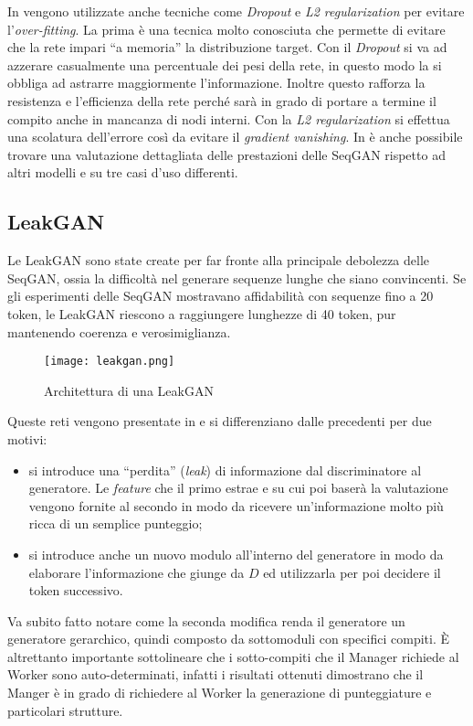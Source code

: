 In \cite{SeqGAN} vengono utilizzate anche tecniche come \emph{Dropout} e \emph{L2 regularization} per evitare l'\emph{over-fitting}. %
La prima è una tecnica molto conosciuta che permette di evitare che la rete impari ``a memoria'' la distribuzione target.
Con il \emph{Dropout} si va ad azzerare casualmente una percentuale dei pesi della rete, in questo modo la si obbliga ad astrarre maggiormente l'informazione.
Inoltre questo rafforza la resistenza e l'efficienza della rete perché sarà in grado di portare a termine il compito anche in mancanza di nodi interni.
Con la \emph{L2 regularization} si effettua una scolatura dell'errore così da evitare il \emph{gradient vanishing}. %
In \cite{SeqGAN} è anche possibile trovare una valutazione dettagliata delle prestazioni delle SeqGAN rispetto ad altri modelli e su tre casi d'uso differenti.


\subsection{LeakGAN}
Le LeakGAN sono state create per far fronte alla principale debolezza delle SeqGAN, ossia la difficoltà nel generare sequenze lunghe che siano convincenti.
Se gli esperimenti delle SeqGAN mostravano affidabilità con sequenze fino a 20 token, le LeakGAN riescono a raggiungere lunghezze di 40 token, pur mantenendo coerenza e verosimiglianza.
\begin{figure}[ht]
  \centering
  \texttt{[image: leakgan.png]}
  \caption{Architettura di una LeakGAN \cite{LeakGAN}}
  \label{fig:leakgan}
\end{figure}

Queste reti vengono presentate in \cite{LeakGAN} e si differenziano dalle precedenti per due motivi:
\begin{itemize}
  \item si introduce una ``perdita'' (\emph{leak}) di informazione dal discriminatore al generatore.
    Le \emph{feature} che il primo estrae e su cui poi baserà la valutazione vengono fornite al secondo in modo da ricevere un'informazione molto più ricca di un semplice punteggio; 
  \item si introduce anche un nuovo modulo all'interno del generatore in modo da elaborare l'informazione che giunge da $D$ ed utilizzarla per poi decidere il token successivo.
\end{itemize}
Va subito fatto notare come la seconda modifica renda il generatore un generatore gerarchico, quindi composto da sottomoduli con specifici compiti.
È altrettanto importante sottolineare che i sotto-compiti che il Manager richiede al Worker sono auto-determinati, infatti i risultati ottenuti dimostrano che il Manger è in grado di richiedere al Worker la generazione di punteggiature e particolari strutture.


